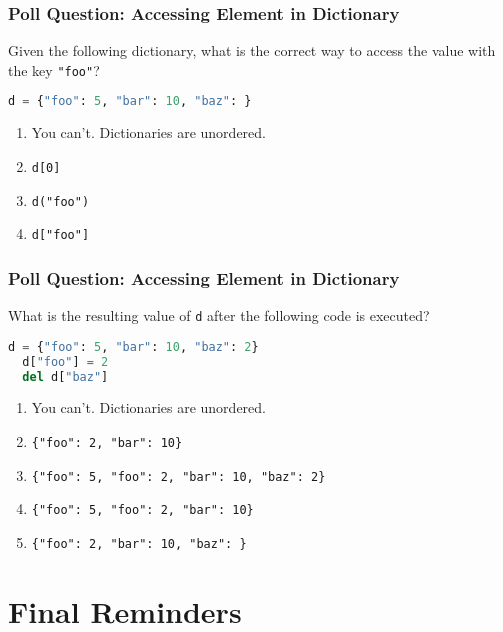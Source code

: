 \documentclass{beamer}
\begin{document}
%
%
\begin{frame}[fragile]
  \frametitle{Poll Question: Accessing Element in Dictionary}
  Given the following dictionary, what is the correct way to access the value with the key \lstinline|"foo"|?
  \begin{lstlisting}[language=Python, autogobble]
  d = {"foo": 5, "bar": 10, "baz": }
  \end{lstlisting}
  \vfill
  \begin{enumerate}[A] 
    \item You can't. Dictionaries are unordered.
    \item \lstinline|d[0]|
    \item \lstinline|d("foo")|
    \item \lstinline|d["foo"]| %
  \end{enumerate}
\end{frame}


%
%
\begin{frame}[fragile]
  \frametitle{Poll Question: Accessing Element in Dictionary}
  What is the resulting value of \lstinline|d| after the following code is executed?
  \begin{lstlisting}[language=Python, autogobble]
  d = {"foo": 5, "bar": 10, "baz": 2}
  d["foo"] = 2
  del d["baz"] 
  \end{lstlisting}
  \vfill
  \begin{enumerate}[A] 
    \item You can't. Dictionaries are unordered.
    \item \lstinline|{"foo": 2, "bar": 10}|  %
    \item \lstinline|{"foo": 5, "foo": 2, "bar": 10, "baz": 2}|
    \item \lstinline|{"foo": 5, "foo": 2, "bar": 10}|
    \item \lstinline|{"foo": 2, "bar": 10, "baz": }|
  \end{enumerate}
\end{frame}

\section{Final Reminders}
\end{document}
